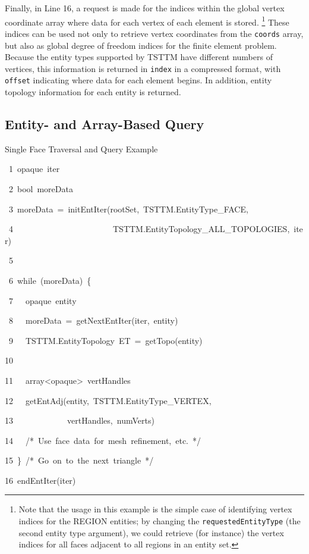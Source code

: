 Finally, in Line 16, a request is made for the indices within the
global vertex coordinate array where data for each vertex of each
element is stored.%
\footnote{Note that the usage in this example is the simple case of identifying
vertex indices for the REGION entities; by changing the \texttt{requestedEntityType}
(the second entity type argument), we could retrieve (for instance)
the vertex indices for all faces adjacent to all regions in an entity
set.%
} These indices can be used not only to retrieve vertex coordinates
from the \texttt{coords} array, but also as global degree of freedom
indices for the finite element problem. Because the entity types supported
by TSTTM have different numbers of vertices, this information is returned
in \texttt{index} in a compressed format, with \texttt{offset} indicating
where data for each element begins. In addition, entity topology information
for each entity is returned.


\subsection{Entity- and Array-Based Query\label{sub:Ent-Interface}}

%
\begin{algorithm*}

\caption{Single Face Traversal and Query Example\label{alg:entity-example}}

\begin{lyxcode}
~1~opaque~iter

~2~bool~moreData

~3~moreData~=~initEntIter(rootSet,~TSTTM.EntityType\_FACE,

~4~~~~~~~~~~~~~~~~~~~~~~~~TSTTM.EntityTopology\_ALL\_TOPOLOGIES,~iter)

~5~

~6~while~(moreData)~\{

~7~~~opaque~entity

~8~~~moreData~=~getNextEntIter(iter,~entity)

~9~~~TSTTM.EntityTopology~ET~=~getTopo(entity)

10~~~

11~~~array<opaque>~vertHandles

12~~~getEntAdj(entity,~TSTTM.EntityType\_VERTEX,

13~~~~~~~~~~~~~vertHandles,~numVerts)

14~~~/{*}~Use~face~data~for~mesh~refinement,~etc.~{*}/

15~\}~/{*}~Go~on~to~the~next~triangle~{*}/

16~endEntIter(iter)
\end{lyxcode}

\end{algorithm*}


